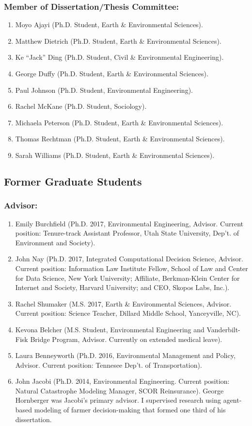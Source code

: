\documentclass[10pt]{article}
\begin{document}
    \subsubsection{Member of Dissertation/Thesis Committee:}
    \begin{enumerate}
    \item Moyo Ajayi (Ph.D. Student, Earth \& Environmental Sciences).
    \item Matthew Dietrich (Ph.D. Student, Earth \& Environmental Sciences).
    \item Ke ``Jack'' Ding (Ph.D. Student, Civil \& Environmental Engineering).
    \item George Duffy (Ph.D. Student, Earth \& Environmental Sciences).
    \item Paul Johnson (Ph.D. Student, Environmental Engineering).
    \item Rachel McKane (Ph.D. Student, Sociology).
    \item Michaela Peterson (Ph.D. Student, Earth \& Environmental Sciences).
    \item Thomas Rechtman (Ph.D. Student, Earth \& Environmental Sciences).
    \item Sarah Williams (Ph.D. Student, Earth \& Environmental Sciences).
    \end{enumerate}
    \subsection{Former Graduate Students}
    \subsubsection{Advisor:}
    \begin{enumerate}
	\item Emily Burchfield (Ph.D. 2017, Environmental Engineering, Advisor. Current position: Tenure-track Assistant Professor, Utah State University, Dep't. of Environment and Society).
	\item John Nay (Ph.D. 2017, Integrated Computational Decision Science, Advisor. Current position: Information Law Institute Fellow, School of Law and Center for Data Science, New York University; Affiliate, Berkman-Klein Center for Internet and Society, Harvard University; and CEO, Skopos Labs, Inc.).
	\item Rachel Shumaker (M.S. 2017, Earth \& Environmental Sciences, Advisor. Current position: Science Teacher, Dillard Middle School, Yanceyville, NC).
    \item Kevona Belcher (M.S. Student, Environmental Engineering and Vanderbilt-Fisk Bridge Program, Advisor. Currently on extended medical leave).
	\item Laura Benneyworth (Ph.D. 2016, Environmental Management and Policy, Advisor. Current position: Tennesee Dep't. of Transportation).
	\item John Jacobi (Ph.D. 2014, Environmental Engineering. Current position: Natural Catastrophe Modeling Manager, SCOR Reinsurance). George Hornberger was Jacobi's primary advisor. I supervised research using agent-based modeling of farmer decision-making that formed one third of his dissertation.
    \end{enumerate}
\end{document}
